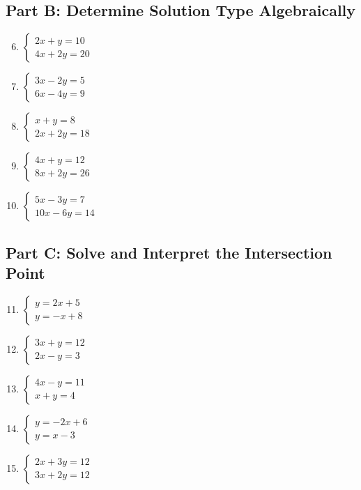 \documentclass[12pt]{article}
\begin{document}
\subsection*{Part B: Determine Solution Type Algebraically}
\begin{enumerate}
    \setcounter{enumi}{5}
    \item \(\begin{cases} 2x + y = 10 \\ 4x + 2y = 20 \end{cases}\)
    \item \(\begin{cases} 3x - 2y = 5 \\ 6x - 4y = 9 \end{cases}\)
    \item \(\begin{cases} x + y = 8 \\ 2x + 2y = 18 \end{cases}\)
    \item \(\begin{cases} 4x + y = 12 \\ 8x + 2y = 26 \end{cases}\)
    \item \(\begin{cases} 5x - 3y = 7 \\ 10x - 6y = 14 \end{cases}\)
\end{enumerate}

\subsection*{Part C: Solve and Interpret the Intersection Point}
\begin{enumerate}
    \setcounter{enumi}{10}
    \item \(\begin{cases} y = 2x + 5 \\ y = -x + 8 \end{cases}\)
    \item \(\begin{cases} 3x + y = 12 \\ 2x - y = 3 \end{cases}\)
    \item \(\begin{cases} 4x - y = 11 \\ x + y = 4 \end{cases}\)
    \item \(\begin{cases} y = -2x + 6 \\ y = x - 3 \end{cases}\)
    \item \(\begin{cases} 2x + 3y = 12 \\ 3x + 2y = 12 \end{cases}\)
\end{enumerate}
\end{document}
